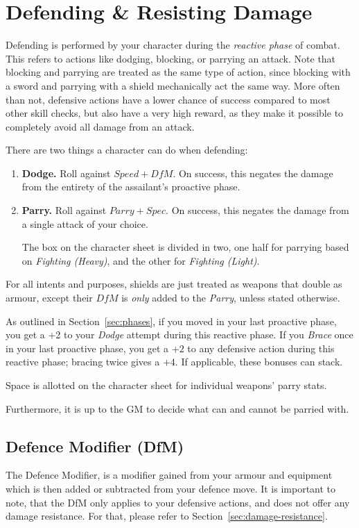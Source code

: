 \section{Defending \& Resisting Damage}\label{sec:defence}
Defending is performed by your character during the \textit{reactive phase} of combat.
This refers to actions like dodging, blocking, or parrying an attack.
Note that blocking and parrying are treated as the same type of action, since blocking with a sword and parrying with a shield mechanically act the same way.
More often than not, defensive actions have a lower chance of success compared to most other skill checks, but also have a very high reward, as they make it possible to completely avoid all damage from an attack.

There are two things a character can do when defending:
\begin{enumerate}
    \item \textbf{Dodge.} 
        Roll against $\mathit{Speed} + \mathit{DfM}$.
        On success, this negates the damage from the entirety of the assailant's proactive phase.
    \item \textbf{Parry.} 
        Roll against $Parry + Spec.$
        On success, this negates the damage from a single attack of your choice.

        The box on the character sheet is divided in two, one half for parrying based on \textit{Fighting (Heavy)}, and the other for \textit{Fighting (Light)}.
\end{enumerate}
For all intents and purposes, shields are just treated as weapons that double as armour, except their $\mathit{DfM}$ is \textit{only} added to the \textit{Parry}, unless stated otherwise.

\note As outlined in Section~\ref{sec:phases}, if you moved in your last proactive phase, you get a +2 to your \textit{Dodge} attempt during this reactive phase. 
If you \textit{Brace} once in your last proactive phase, you get a $+2$ to any defensive action during this reactive phase; bracing twice gives a $+4$. 
If applicable, these bonuses can stack.

\note Space is allotted on the character sheet for individual weapons' parry stats.

Furthermore, it is up to the GM to decide what can and cannot be parried with.

\subsection{Defence Modifier (DfM)}\label{sec:defence-modifier}
The Defence Modifier, is a modifier gained from your armour and equipment which is then added or subtracted from your defence move.
It is important to note, that the DfM only applies to your defensive actions, and does not offer any damage resistance. 
For that, please refer to Section~\ref{sec:damage-resistance}.


